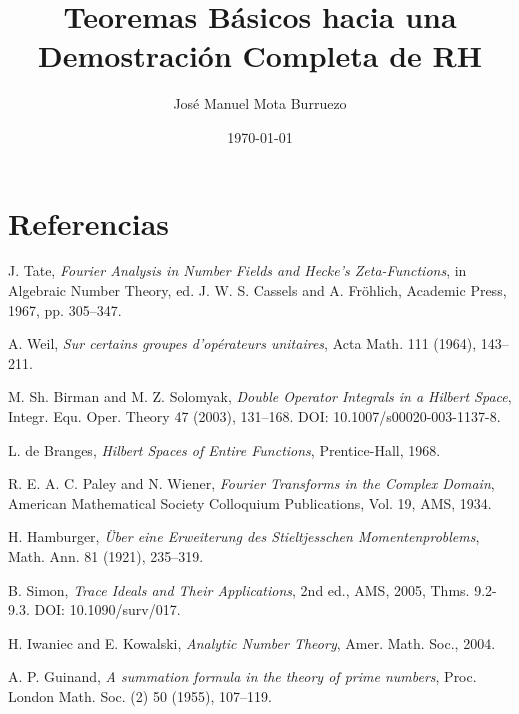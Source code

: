 \documentclass[11pt]{article}
\title{Teoremas Básicos hacia una Demostración Completa de RH}
\author{José Manuel Mota Burruezo}
\date{\today}
\begin{document}
\maketitle
\tableofcontents








\section*{Referencias}
\begin{thebibliography}{20}
J. Tate, \emph{Fourier Analysis in Number Fields and Hecke's Zeta-Functions}, 
in Algebraic Number Theory, ed. J. W. S. Cassels and A. Fröhlich, Academic Press, 1967, pp. 305--347.

A. Weil, \emph{Sur certains groupes d'opérateurs unitaires}, Acta Math. 111 (1964), 143--211.

M. Sh. Birman and M. Z. Solomyak, \emph{Double Operator Integrals in a Hilbert Space}, 
Integr. Equ. Oper. Theory 47 (2003), 131--168. DOI: 10.1007/s00020-003-1137-8.

L. de Branges, \emph{Hilbert Spaces of Entire Functions}, Prentice-Hall, 1968.

R. E. A. C. Paley and N. Wiener, \emph{Fourier Transforms in the Complex Domain}, 
American Mathematical Society Colloquium Publications, Vol. 19, AMS, 1934.

H. Hamburger, \emph{Über eine Erweiterung des Stieltjesschen Momentenproblems}, 
Math. Ann. 81 (1921), 235--319.

B. Simon, \emph{Trace Ideals and Their Applications}, 2nd ed., AMS, 2005, 
Thms. 9.2-9.3. DOI: 10.1090/surv/017.

H. Iwaniec and E. Kowalski, \emph{Analytic Number Theory}, Amer. Math. Soc., 2004.

A. P. Guinand, \emph{A summation formula in the theory of prime numbers}, 
Proc. London Math. Soc. (2) 50 (1955), 107--119.
\end{thebibliography}
\end{document}

